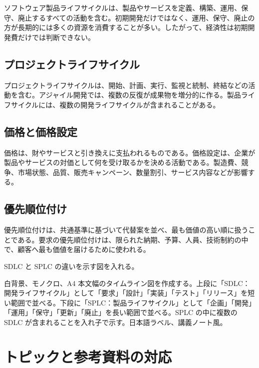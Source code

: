 \documentclass[a4paper,11pt]{article}
\begin{document}
ソフトウェア製品ライフサイクルは、製品やサービスを定義、構築、運用、保守、廃止するすべての活動を含む。初期開発だけではなく、運用、保守、廃止の方が長期的には多くの資源を消費することが多い。したがって、経済性は初期開発費だけでは判断できない。

\subsection{プロジェクトライフサイクル}

プロジェクトライフサイクルは、開始、計画、実行、監視と統制、終結などの活動を含む。アジャイル開発では、複数の反復が成果物を増分的に作る。製品ライフサイクルには、複数の開発ライフサイクルが含まれることがある。

\subsection{価格と価格設定}

価格は、財やサービスと引き換えに支払われるものである。価格設定は、企業が製品やサービスの対価として何を受け取るかを決める活動である。製造費、競争、市場状態、品質、販売キャンペーン、数量割引、サービス内容などが影響する。

\subsection{優先順位付け}

優先順位付けは、共通基準に基づいて代替案を並べ、最も価値の高い順に扱うことである。要求の優先順位付けは、限られた納期、予算、人員、技術制約の中で、顧客へ最も価値を届けるために使われる。

\begin{todobox}
SDLC と SPLC の違いを示す図を入れる。
\end{todobox}
\begin{promptbox}
白背景、モノクロ、A4 本文幅のタイムライン図を作成する。上段に「SDLC：開発ライフサイクル」として「要求」「設計」「実装」「テスト」「リリース」を短い範囲で並べる。下段に「SPLC：製品ライフサイクル」として「企画」「開発」「運用」「保守」「更新」「廃止」を長い範囲で並べる。SPLC の中に複数の SDLC が含まれることを入れ子で示す。日本語ラベル、講義ノート風。
\end{promptbox}

\section{トピックと参考資料の対応}
\end{document}
